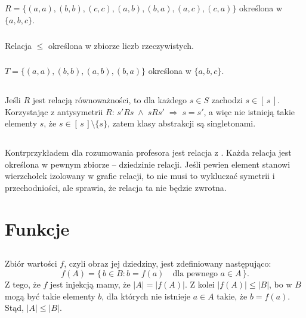 \subsection{} %
\subsubsection{}
$R = \bigl\{(a,a),(b,b),(c,c),(a,b),(b,a),(a,c),(c,a)\bigr\}$ określona w $\{a,b,c\}$.

\subsubsection{}
Relacja $\le$ określona w zbiorze liczb rzeczywistych.

\subsubsection{}
$T = \bigl\{(a,a),(b,b),(a,b),(b,a)\bigr\}$ określona w $\{a,b,c\}$.

\subsection{} %
Jeśli $R$ jest relacją równoważności, to dla każdego $s\in S$ zachodzi $s\in[\,s\,]$. Korzystając z antysymetrii $R$: $s'Rs\;\wedge\;sRs'\;\Rightarrow\;s=s'$, a więc nie istnieją takie elementy $s$, że $s\in[\,s\,]\setminus\{s\}$, zatem klasy abstrakcji są singletonami.

\subsection{} %
Kontrprzykładem dla rozumowania profesora jest relacja z . Każda relacja jest określona w pewnym zbiorze -- dziedzinie relacji. Jeśli pewien element stanowi wierzchołek izolowany w grafie relacji, to nie musi to wykluczać symetrii i przechodniości, ale sprawia, że relacja ta nie będzie zwrotna.

\section{Funkcje}

\subsection{} %
\subsubsection{}
Zbiór wartości $f$, czyli obraz jej dziedziny, jest zdefiniowany następująco:
\[
	f(A) = \bigl\{\,b\in B:b=f(a) \quad\text{dla pewnego $a\in A$}\,\bigr\}.
\]
Z tego, że $f$ jest injekcją mamy, że $|A|=|f(A)|$. Z kolei $|f(A)|\le|B|$, bo w $B$ mogą być takie elementy $b$, dla których nie istnieje $a\in A$ takie, że $b=f(a)$. Stąd, $|A|\le|B|$.

